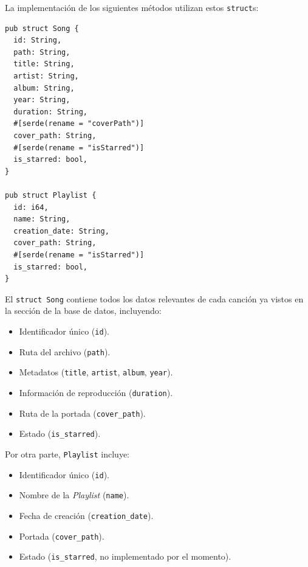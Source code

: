 \documentclass[11pt, a4paper]{article}
\begin{document}
            La implementación de los siguientes métodos utilizan estos \texttt{struct}s:

            \begin{lstlisting}[caption={structs Song y Playlist}]
pub struct Song {
  id: String,
  path: String,
  title: String,
  artist: String,
  album: String,
  year: String,
  duration: String,
  #[serde(rename = "coverPath")]
  cover_path: String,
  #[serde(rename = "isStarred")]
  is_starred: bool,
}

pub struct Playlist {
  id: i64,
  name: String,
  creation_date: String,
  cover_path: String,
  #[serde(rename = "isStarred")]
  is_starred: bool,
}
            \end{lstlisting}

            El \texttt{struct Song} contiene todos los datos relevantes de cada canción ya vistos en la sección de la base de datos, incluyendo:

            \begin{itemize}
              \item Identificador único (\texttt{id}).
              \item Ruta del archivo (\texttt{path}).
              \item Metadatos (\texttt{title}, \texttt{artist}, \texttt{album}, \texttt{year}).
              \item Información de reproducción (\texttt{duration}).
              \item Ruta de la portada (\texttt{cover\_path}).
              \item Estado (\texttt{is\_starred}).
            \end{itemize}

            Por otra parte, \texttt{Playlist} incluye:

            \begin{itemize}
              \item Identificador único (\texttt{id}).
              \item Nombre de la \textit{Playlist} (\texttt{name}).
              \item Fecha de creación (\texttt{creation\_date}).
              \item Portada (\texttt{cover\_path}).
              \item Estado (\texttt{is\_starred}, no implementado por el momento).
            \end{itemize}
\end{document}
